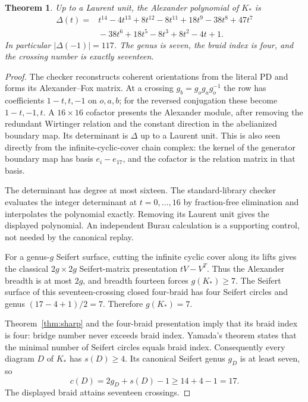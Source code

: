 \documentclass[11pt]{article}
\newtheorem{theorem}{Theorem}
\begin{document}
\begin{theorem}\label{thm:crossing}
Up to a Laurent unit, the Alexander polynomial of $K_*$ is
\[
\begin{aligned}
\Delta(t)={}&t^{14}-4t^{13}+8t^{12}-8t^{11}+18t^9-38t^8+47t^7\\
           &{}-38t^6+18t^5-8t^3+8t^2-4t+1.
\end{aligned}
\]
In particular $|\Delta(-1)|=117$. The genus is seven, the braid
index is four, and the crossing number is exactly seventeen.
\end{theorem}
\begin{proof}
The checker reconstructs coherent orientations from the literal PD
and forms its Alexander--Fox matrix. At a crossing
$g_b=g_o g_a g_o^{-1}$ the row has coefficients $1-t,t,-1$ on
$o,a,b$; for the reversed conjugation these become $1-t,-1,t$.
A $16\times16$ cofactor presents the Alexander module, after removing
the redundant Wirtinger relation and the constant direction in the
abelianized boundary map. Its determinant is $\Delta$ up to a Laurent
unit. This is also seen directly from the infinite-cyclic-cover chain
complex: the kernel of the generator boundary map has basis
$e_i-e_{17}$, and the cofactor is the relation matrix in that basis.

The determinant has degree at most sixteen. The standard-library
checker evaluates the integer determinant at $t=0,\ldots,16$ by
fraction-free elimination and interpolates the polynomial exactly.
Removing its Laurent unit gives the displayed polynomial. An
independent Burau calculation is a supporting control, not needed by
the canonical replay.

For a genus-$g$ Seifert surface, cutting the infinite cyclic cover
along its lifts gives the classical $2g\times2g$ Seifert-matrix
presentation $tV-V^T$. Thus the Alexander breadth is at most $2g$,
and breadth fourteen forces $g(K_*)\ge7$.
The Seifert surface of this seventeen-crossing closed four-braid has
four Seifert circles and genus $(17-4+1)/2=7$. Therefore $g(K_*)=7$.

Theorem~\ref{thm:sharp} and the four-braid presentation imply that
its braid index is four: bridge number never exceeds braid index.
Yamada's theorem \cite[Theorem~3, printed p.~347]{yamada} states that
the minimal number of Seifert circles equals braid index.
Consequently every diagram $D$ of $K_*$ has $s(D)\ge4$.
Its canonical Seifert genus $g_D$ is at least seven, so
\[
           c(D)=2g_D+s(D)-1\ge14+4-1=17.
\]
The displayed braid attains seventeen crossings.
\end{proof}
\end{document}
